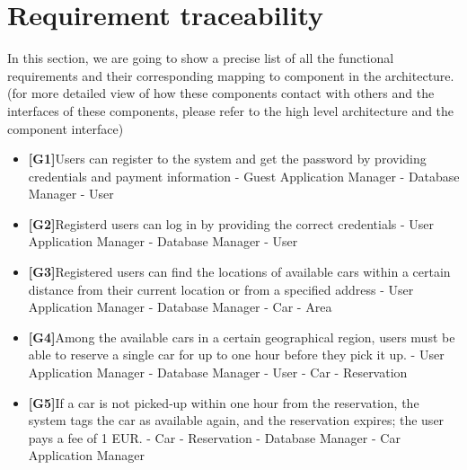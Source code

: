 \documentclass{article}
\begin{document}
	\section{Requirement traceability}
	In this section, we are going to show a precise list of all the functional requirements and their corresponding mapping to component in the architecture.(for more detailed view of how these components contact with others and the interfaces of these components, please refer to the high level architecture and the component interface)
	\begin{itemize}
		\item\textbf{[G1]}Users can register to the system and get the password by providing credentials and payment information
		\newline - Guest Application Manager
		\newline - Database Manager
		\newline - User
		
		\item\textbf{[G2]}Registerd users can log in by providing the correct credentials
		\newline - User Application Manager
		\newline - Database Manager
		\newline - User
		
		\item\textbf{[G3]}Registered users can find the locations of available cars within a certain distance from their current location or from a specified address
		\newline - User Application Manager
		\newline - Database Manager
		\newline - Car 
		\newline - Area
		
		\item\textbf{[G4]}Among the available cars in a certain geographical region, users must be able to reserve a single car for up to one hour before they pick it up.
		\newline - User Application Manager
		\newline - Database Manager
		\newline - User
		\newline - Car
		\newline - Reservation
		
		\item\textbf{[G5]}If a car is not picked‐up within one hour from the reservation, the system tags the car as available again, and the reservation expires; the user pays a fee of 1 EUR.
		\newline - Car
		\newline - Reservation
		\newline - Database Manager
		\newline - Car Application Manager
		

\end{itemize}
\end{document}
